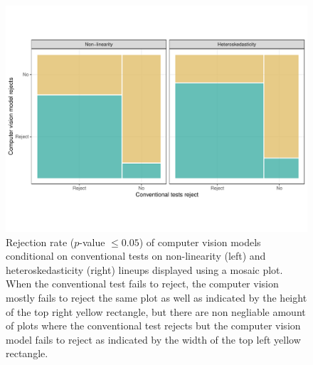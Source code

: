 \documentclass[]{interact}
\theoremstyle{plain}%
\theoremstyle{definition}
\theoremstyle{remark}
\begin{document}
\begin{figure}[!h]

{\centering \includegraphics[width=1\linewidth]{paper_files/figure-latex/conv-mosaic-1} 

}

\caption{Rejection rate ($p$-value $\leq0.05$) of computer vision models conditional on conventional tests on non-linearity (left) and heteroskedasticity (right) lineups displayed using a mosaic plot. When the conventional test fails to reject, the computer vision mostly fails to reject the same plot as well as indicated by the height of the top right yellow rectangle, but there are non negliable amount of plots where the conventional test rejects but the computer vision model fails to reject as indicated by the width of the top left yellow rectangle.}\label{fig:conv-mosaic}
\end{figure}
\end{document}
